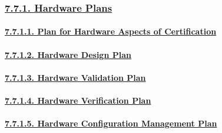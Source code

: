 \documentclass[
]{article}
\begin{document}
\hypertarget{hardware-plans}{%
\subsubsection{\texorpdfstring{\protect\hyperlink{hardware-plans-1}{7.7.1.
Hardware Plans}}{7.7.1. Hardware Plans}}\label{hardware-plans}}

\hypertarget{plan-for-hardware-aspects-of-certification}{%
\paragraph{\texorpdfstring{\protect\hyperlink{plan-for-hardware-aspects-of-certification-1}{7.7.1.1.
Plan for Hardware Aspects of
Certification}}{7.7.1.1. Plan for Hardware Aspects of Certification}}\label{plan-for-hardware-aspects-of-certification}}

\hypertarget{hardware-design-plan}{%
\paragraph{\texorpdfstring{\protect\hyperlink{hardware-design-plan-1}{7.7.1.2.
Hardware Design
Plan}}{7.7.1.2. Hardware Design Plan}}\label{hardware-design-plan}}

\hypertarget{hardware-validation-plan}{%
\paragraph{\texorpdfstring{\protect\hyperlink{hardware-validation-plan-1}{7.7.1.3.
Hardware Validation
Plan}}{7.7.1.3. Hardware Validation Plan}}\label{hardware-validation-plan}}

\hypertarget{hardware-verification-plan}{%
\paragraph{\texorpdfstring{\protect\hyperlink{hardware-verification-plan-1}{7.7.1.4.
Hardware Verification
Plan}}{7.7.1.4. Hardware Verification Plan}}\label{hardware-verification-plan}}

\hypertarget{hardware-configuration-management-plan}{%
\paragraph{\texorpdfstring{\protect\hyperlink{hardware-configuration-management-plan-1}{7.7.1.5.
Hardware Configuration Management
Plan}}{7.7.1.5. Hardware Configuration Management Plan}}\label{hardware-configuration-management-plan}}
\end{document}
